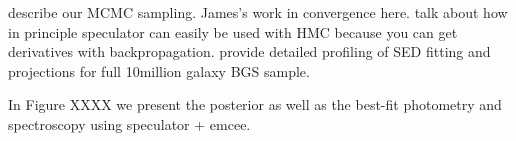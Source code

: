 describe our MCMC sampling. James's work in convergence here. talk about how in
principle speculator can easily be used with HMC because you can get
derivatives with backpropagation. provide detailed profiling of SED fitting and
projections for full 10million galaxy BGS sample. 

In Figure XXXX we present the posterior as well as the best-fit photometry and
spectroscopy using speculator + emcee. 


